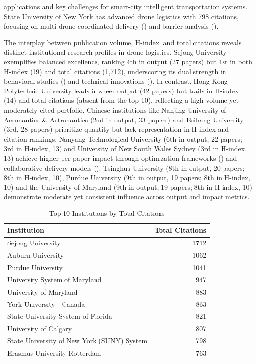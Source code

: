 \documentclass{article}
\begin{document}
applications and key challenges for smart-city intelligent transportation systems. State University of New York has advanced drone logistics with 798 citations, focusing on multi-drone coordinated delivery (\cite{WOS:000509790500020}) and barrier analysis (\cite{WOS:000547773000001}).

The interplay between publication volume, H-index, and total citations reveals distinct institutional research profiles in drone logistics. Sejong University exemplifies balanced excellence, ranking 4th in output (27 papers) but 1st in both H-index (19) and total citations (1,712), underscoring its dual strength in behavioral studies (\cite{WOS:000478712400012}) and technical innovations (\cite{WOS:000538038400010}). In contrast, Hong Kong Polytechnic University leads in sheer output (42 papers) but trails in H-index (14) and total citations (absent from the top 10), reflecting a high-volume yet moderately cited portfolio. Chinese institutions like Nanjing University of Aeronautics \& Astronautics (2nd in output, 33 papers) and Beihang University (3rd, 28 papers) prioritize quantity but lack representation in H-index and citation rankings. Nanyang Technological University (6th in output, 22 papers; 3rd in H-index, 13) and University of New South Wales Sydney (3rd in H-index, 13) achieve higher per-paper impact through optimization frameworks (\cite{WOS:000501349900060}) and collaborative delivery models (\cite{WOS:000467564700204}). Tsinghua University (8th in output, 20 papers; 8th in H-index, 10), Purdue University (9th in output, 19 papers; 8th in H-index, 10) and the University of Maryland (9th in output, 19 papers; 8th in H-index, 10) demonstrate moderate yet consistent influence across output and impact metrics.



\begin{table}[htbp]
  \centering
  \caption{Top 10 Institutions by Total Citations}
  \label{tab:citations}
  \begin{tabularx}{0.9\textwidth}{@{} >{\raggedright}X r @{}}
    \toprule
    Institution & Total Citations \\
    \midrule
    Sejong University & 1712 \\
    Auburn University & 1062 \\
    Purdue University & 1041 \\
    University System of Maryland & 947 \\
    University of Maryland & 883 \\
    York University - Canada & 863 \\
    State University System of Florida & 821 \\
    University of Calgary & 807 \\
    State University of New York (SUNY) System & 798 \\
    Erasmus University Rotterdam & 763 \\
    \bottomrule
  \end{tabularx}
\end{table}
\end{document}
